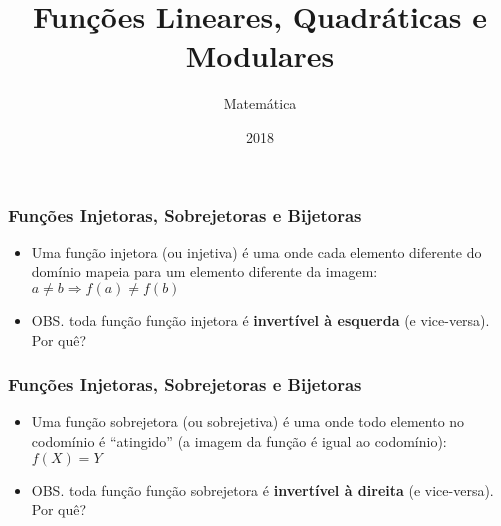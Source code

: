 \documentclass[usenames,dvipsnames,svgnames]{beamer}
\title{Funções Lineares, Quadráticas e Modulares}
\author{Matemática}
\institute{ONGEP}
\date{2018}
\begin{document}
\frame{\titlepage}

\begin{frame}	
	\frametitle{Funções Injetoras, Sobrejetoras e Bijetoras}

	\begin{itemize}
		\item Uma função injetora (ou injetiva) é uma onde cada elemento diferente do domínio mapeia para um elemento diferente da imagem: $a \neq b \Rightarrow f(a) \neq f(b)$
		\item OBS. toda função função injetora é \textbf{invertível à esquerda} (e vice-versa). Por quê?
	\end{itemize}

	\begin{adjustbox}{max totalsize={\textwidth}{.65\textheight},center}
	\end{adjustbox}

\end{frame}

\begin{frame}	
	\frametitle{Funções Injetoras, Sobrejetoras e Bijetoras}

	\begin{itemize}
		\item Uma função sobrejetora (ou sobrejetiva) é uma onde todo elemento no codomínio é ``atingido'' (a imagem da função é igual ao codomínio): $f(X) = Y$
		\item OBS. toda função função sobrejetora é \textbf{invertível à direita} (e vice-versa). Por quê?
	\end{itemize}

	\begin{adjustbox}{max totalsize={\textwidth}{.65\textheight},center}
	\end{adjustbox}

\end{frame}
\end{document}
